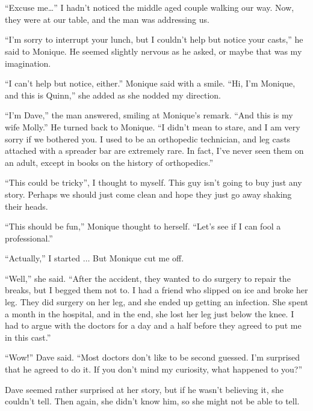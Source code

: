 \chapter{}
``Excuse me…'' I hadn't noticed the middle aged couple walking our way. Now, they were at our
table, and the man was addressing us.

``I'm sorry to interrupt your lunch, but I couldn't help but notice your casts,'' he said to
Monique. He seemed slightly nervous as he asked, or maybe that was my imagination.

``I can't help but notice, either.'' Monique said with a smile. ``Hi, I'm Monique, and this is
Quinn,'' she added as she nodded my direction.

``I'm Dave,'' the man answered, smiling at Monique's remark. ``And this is my wife Molly.'' He
turned back to Monique. ``I didn't mean to stare, and I am very sorry if we bothered you. I used
to be an orthopedic technician, and leg casts attached with a spreader bar are extremely rare.
In fact, I've never seen them on an adult, except in books on the history of orthopedics.''

``This could be tricky'', I thought to myself. This guy isn't going to buy just any story.
Perhaps we should just come clean and hope they just go away shaking their heads.

\begin{thought}
``This should be fun,'' Monique thought to herself. ``Let's see if I can fool a professional.''
\end{thought}

``Actually,'' I started $\ldots$ But Monique cut me off.

``Well,'' she said. ``After the accident, they wanted to do surgery to repair the breaks, but
I begged them not to. I had a friend who slipped on ice and broke her leg. They did surgery on
her leg, and she ended up getting an infection. She spent a month in the hospital, and in the
end, she lost her leg just below the knee. I had to argue with the doctors for a day and a half
before they agreed to put me in this cast.''

``Wow!'' Dave said. ``Most doctors don't like to be second guessed. I'm surprised that he
agreed to do it. If you don't mind my curiosity, what happened to you?''

\begin{thought}
Dave seemed rather surprised at her story, but if he wasn't believing it, she couldn't
tell. Then again, she didn't know him, so she might not be able to tell.
\end{thought}


